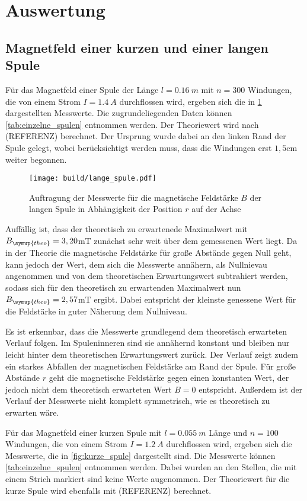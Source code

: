 \section{Auswertung}
\label{sec:Auswertung}

\subsection{Magnetfeld einer kurzen und einer langen Spule}

Für das Magnetfeld einer Spule der Länge $l=\SI{0,16}{m}$ mit $n=300$ Windungen,
die von einem Strom $I=\SI{1,4}{A}$ durchflossen wird, ergeben sich die in
\ref{fig:lange_spule} dargestellten Messwerte. Die zugrundeliegenden Daten können
\ref{tab:einzelne_spulen} entnommen werden. Der Theoriewert wird nach (REFERENZ) berechnet.
Der Ursprung wurde dabei an den linken Rand der Spule gelegt, wobei berücksichtigt werden
muss, dass die Windungen erst $1,5$cm weiter begonnen.

\begin{figure}
  \centering
  \texttt{[image: build/lange\_spule.pdf]}
  \caption{Auftragung der Messwerte für die magnetische Feldstärke $B$ der langen Spule
  in Abhängigkeit der Position $r$ auf der Achse}
  \label{fig:lange_spule}
\end{figure}

Auffällig ist, dass der theoretisch zu erwartenede Maximalwert mit $B_{\symup{theo}}=3,20$mT
zunächst sehr weit über dem gemessenen Wert liegt. Da in der Theorie die magnetische
Feldstärke für große Abstände gegen Null geht, kann jedoch der Wert, dem sich die
Messwerte annähern, als Nullnievau angenommen und von dem theoretischen Erwartungswert
subtrahiert werden, sodass sich für den theoretisch zu erwartenden Maximalwert nun
$B_{\symup{theo}}=2,57$mT ergibt. Dabei entspricht der kleinste genessene Wert für die Feldstärke
in guter Näherung dem Nullniveau.

Es ist erkennbar, dass die Messwerte grundlegend dem theoretisch erwarteten Verlauf folgen.
Im Spuleninneren sind sie annähernd konstant und bleiben nur leicht hinter dem
theoretischen Erwartungswert zurück. Der Verlauf zeigt zudem ein starkes Abfallen
der magnetischen Feldstärke am Rand der Spule. Für große Abstände $r$ geht die magnetische
Feldstärke gegen einen konstanten Wert, der jedoch nicht dem theoretisch erwarteten
Wert $B=0$ entspricht. Außerdem ist der Verlauf der Messwerte nicht komplett symmetrisch,
wie es theoretisch zu erwarten wäre.


Für das Magnetfeld einer kurzen Spule mit $l=\SI{0,055}{m}$ Länge und $n=100$ Windungen,
die von einem Strom $I=\SI{1,2}{A}$ durchflossen wird, ergeben sich die Messwerte, die in
\ref{fig:kurze_spule} dargestellt sind. Die Messwerte können \ref{tab:einzelne_spulen}
entnommen werden. Dabei wurden an den Stellen, die mit einem Strich markiert sind keine
Werte augenommen.
Der Theoriewert für die kurze Spule wird ebenfalls mit (REFERENZ) berechnet.

